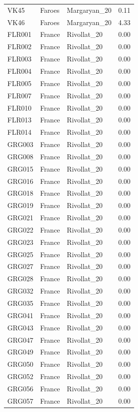 \begin{longtable}[t]{lllr}
VK45 & Faroes & Margaryan\_20 & 0.11\\
VK46 & Faroes & Margaryan\_20 & 4.33\\
FLR001 & France & Rivollat\_20 & 0.00\\
FLR002 & France & Rivollat\_20 & 0.00\\
FLR003 & France & Rivollat\_20 & 0.00\\
FLR004 & France & Rivollat\_20 & 0.00\\
FLR005 & France & Rivollat\_20 & 0.00\\
FLR007 & France & Rivollat\_20 & 0.00\\
FLR010 & France & Rivollat\_20 & 0.00\\
FLR013 & France & Rivollat\_20 & 0.00\\
FLR014 & France & Rivollat\_20 & 0.00\\
GRG003 & France & Rivollat\_20 & 0.00\\
GRG008 & France & Rivollat\_20 & 0.00\\
GRG015 & France & Rivollat\_20 & 0.00\\
GRG016 & France & Rivollat\_20 & 0.00\\
GRG018 & France & Rivollat\_20 & 0.00\\
GRG019 & France & Rivollat\_20 & 0.00\\
GRG021 & France & Rivollat\_20 & 0.00\\
GRG022 & France & Rivollat\_20 & 0.00\\
GRG023 & France & Rivollat\_20 & 0.00\\
GRG025 & France & Rivollat\_20 & 0.00\\
GRG027 & France & Rivollat\_20 & 0.00\\
GRG028 & France & Rivollat\_20 & 0.00\\
GRG032 & France & Rivollat\_20 & 0.00\\
GRG035 & France & Rivollat\_20 & 0.00\\
GRG041 & France & Rivollat\_20 & 0.00\\
GRG043 & France & Rivollat\_20 & 0.00\\
GRG047 & France & Rivollat\_20 & 0.00\\
GRG049 & France & Rivollat\_20 & 0.00\\
GRG050 & France & Rivollat\_20 & 0.00\\
GRG052 & France & Rivollat\_20 & 0.00\\
GRG056 & France & Rivollat\_20 & 0.00\\
GRG057 & France & Rivollat\_20 & 0.00\\

\end{longtable}
